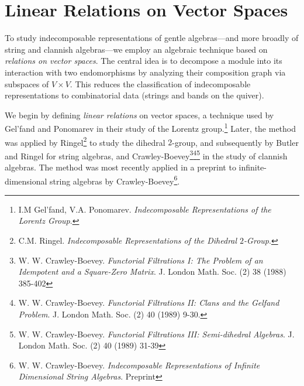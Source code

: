 \documentclass[11pt,oneside]{amsbook}
\numberwithin{equation}{section}
\theoremstyle{plain}
\theoremstyle{definition}
\theoremstyle{remark}
\newcommand{\sidenote}[1]{\footnote{#1}}
\begin{document}
	
	\section{Linear Relations on Vector Spaces}

	To study indecomposable representations of gentle algebras---and more broadly of string and clannish algebras---we employ an algebraic technique based on \emph{relations on vector spaces}.  The central idea is to decompose a module into its interaction with two endomorphisms by analyzing their composition graph via subspaces of $V\times V$.  This reduces the classification of indecomposable representations to combinatorial data (strings and bands on the quiver).

	We begin by defining \textit{linear relations} on vector spaces, a technique used by Gel'fand and Ponomarev in
	their study of the Lorentz group.\sidenote{I.M Gel'fand, V.A. Ponomarev. \emph{Indecomposable Representations of the 
			Lorentz Group}.} Later, the method was applied by Ringel\sidenote{C.M. Ringel. \emph{Indecomposable 
			Representations of the Dihedral $2$-Group}.} to study the dihedral $2$-group, and subsequently by Butler and 
	Ringel for string algebras, and Crawley-Boevey\sidenote{W. W. Crawley-Boevey. \emph{Functorial Filtrations I: The Problem of 
			an Idempotent and a Square-Zero Matrix}. J. London Math. Soc. (2) 38 (1988) 385-402}\sidenote{W. W. Crawley-Boevey. 
		\emph{Functorial Filtrations II: Clans and the Gelfand Problem}. J. London Math. Soc. (2) 40 (1989) 9-30.}\sidenote{W. 
		W. Crawley-Boevey. \emph{Functorial Filtrations III: Semi-dihedral Algebras}. J. London Math. Soc. (2) 40 (1989) 
		31-39} in the study of clannish algebras. The method was most recently applied in a preprint to infinite-
	dimensional string algebras by Crawley-Boevey\sidenote{W. W. Crawley-Boevey. \emph{Indecomposable 
			Representations of Infinite Dimensional String Algebras}. Preprint}.
	
\end{document}

